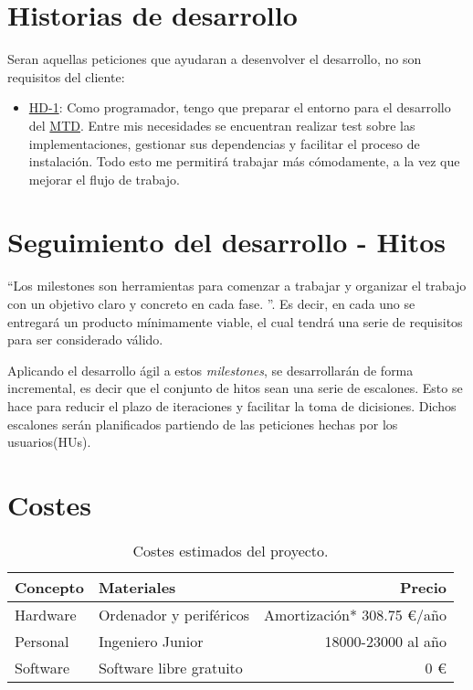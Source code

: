 \section{Historias de desarrollo}
Seran aquellas peticiones que ayudaran a desenvolver el desarrollo, no son requisitos del cliente:

\begin{itemize}
    \item \href{https://github.com/marcosrmartin/MTD_Server/issues/16}{HD-1}: Como programador, tengo que preparar el entorno para el desarrollo del \href{https://github.com/marcosrmartin/MTD_Server/commit/20df5bb6f5af3de7e557c254ad47089db34845aa}{MTD}. Entre mis necesidades se encuentran realizar test sobre las implementaciones, gestionar sus dependencias y facilitar el proceso de instalación. Todo esto me permitirá trabajar más cómodamente, a la vez que mejorar el flujo de trabajo.
\end{itemize}

\section{Seguimiento del desarrollo - Hitos}
``Los milestones son herramientas para comenzar a trabajar y organizar el trabajo con un objetivo claro y concreto en cada fase.
''\cite{iv}. Es decir, en cada uno se entregará un producto mínimamente viable, el cual tendrá una serie de requisitos para ser considerado válido.

Aplicando el desarrollo ágil a estos \textit{milestones}, se desarrollarán de forma incremental, es decir que el conjunto de hitos sean una serie de escalones. Esto se hace para reducir el plazo de iteraciones y facilitar la toma de dicisiones. Dichos escalones serán planificados partiendo de las peticiones hechas por los usuarios(HUs).


\section{Costes}
\begin{table}[H]
	\centering
	\begin{tabular}{| l | l | r |}
        \hline
        \textbf{Concepto} & \textbf{Materiales} & \textbf{Precio} \\
        \hline
        Hardware	& Ordenador y periféricos & Amortización* 308.75 €/año\\
        Personal 	& Ingeniero Junior	& 18000-23000 al año \\
        Software 	& Software libre gratuito & 0 € \\
        \hline
        \hline
	\end{tabular}
	\caption{Costes estimados del proyecto.}
\end{table}

